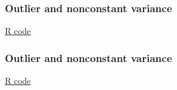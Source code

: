 \documentclass[handout]{beamer}
\begin{document}
   \begin{frame}
   \frametitle{Outlier and nonconstant variance}
   \begin{center}
   \end{center}
   \href{http://stats191.stanford.edu/simple_diagnostics.html#outlier-and-nonconstant-variance}{R code}
   \end{frame}



   \begin{frame}
   \frametitle{Outlier and nonconstant variance}
   \begin{center}
   \end{center}
   \href{http://stats191.stanford.edu/simple_diagnostics.html#outlier-and-nonconstant-variance}{R code}
   \end{frame}


   \begin{frame} 

   \end{frame}

   
\end{document}
